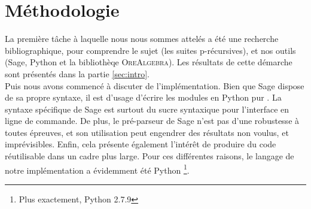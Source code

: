 \documentclass[12pt]{article}
\begin{document}
\section{Méthodologie}
    \label{sec:methodo}
    \par La première tâche à laquelle nous nous sommes attelés a été une recherche bibliographique,
    pour comprendre le sujet (les suites p-récursives), et nos outils (Sage, Python et la 
    bibliothèqe \textsc{OreAlgebra}).
    Les résultats de cette démarche sont présentés dans la partie \ref{sec:intro}.\\
    Puis nous avons commencé à discuter de l'implémentation. Bien que Sage dispose de sa propre
    syntaxe, il est d'usage d'écrire les modules en \og Python pur \fg. La syntaxe spécifique
    de Sage est surtout du sucre syntaxique pour l'interface en ligne de
    commande. De plus, le pré-parseur de Sage n'est pas d'une robustesse à toutes épreuves,
    et son utilisation peut engendrer des résultats non voulus, et imprévisibles. Enfin, 
    cela présente également l'intérêt de produire du code réutilisable dans un cadre plus large.
    Pour ces différentes raisons, le langage de notre implémentation a évidemment été Python
    \footnote{Plus exactement, Python 2.7.9}.
\end{document}
